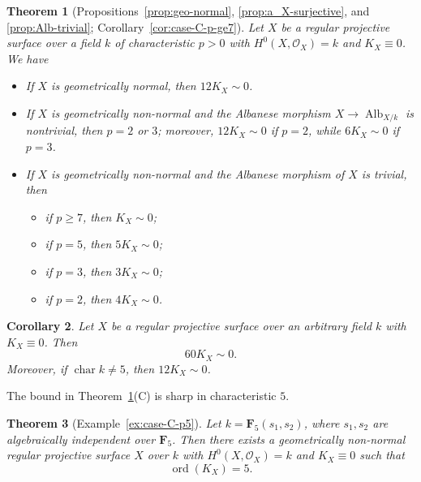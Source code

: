 \documentclass[10pt,abstract=true]{scrartcl}
\numberwithin{equation}{section}
\newtheorem{theorem}{Theorem}[section]
\newtheorem{corollary}[theorem]{Corollary}
\theoremstyle{definition}
\theoremstyle{remark}
\DeclareMathOperator\Alb{Alb}
\DeclareMathOperator\ord{ord}
\begin{document}
\begin{theorem}[{Propositions~\ref{prop:geo-normal}, \ref{prop:a_X-surjective}, and \ref{prop:Alb-trivial}; Corollary~\ref{cor:case-C-p-ge7}}]\label{thm:main}%
  Let $X$ be a regular projective surface over a field $k$ of characteristic $p>0$ with $H^0(X,\mathcal O_X) = k$ and $K_X \equiv 0$. 
  We have
  \begin{itemize}
    \item[\textup{(A)}]  If $X$ is geometrically normal, then $12 K_X \sim 0$.
    \item[\textup{(B)}]  If $X$ is geometrically non-normal and the Albanese morphism $X\to \Alb_{X/k}$ is nontrivial, then $p=2$ or $3$; moreover, $12K_X \sim 0$ if $p=2$, while $6K_X \sim 0$ if $p=3$.
    \item[\textup{(C)}]  If $X$ is geometrically non-normal and the Albanese morphism of $X$ is trivial, then 
      \begin{itemize}
        \item if $p \ge 7$, then $K_X \sim 0$;
        \item if $p = 5$, then $5 K_X \sim 0$;
        \item if $p = 3$, then $3 K_X \sim 0$;
        \item if $p = 2$, then $4 K_X \sim 0$.
      \end{itemize}
  \end{itemize}
\end{theorem}

\begin{corollary}\label{cor:uniform-bound}
  Let $X$ be a regular projective surface over an arbitrary field $k$ with $K_X\equiv0$.  Then
  \[
    60 K_X\sim0.
  \]
  Moreover, if $\operatorname{char} k\ne5$, then $12 K_X \sim 0$.
\end{corollary}

The bound in Theorem~\ref{thm:main}\textup{(C)} is sharp in characteristic $5$.
\begin{theorem}[{Example~\ref{ex:case-C-p5}}]\label{prop:order-five-intro}
  Let $k = \mathbf F_5(s_1,s_2)$, where $s_1,s_2$ are algebraically independent over $\mathbf F_5$.
  Then there exists a geometrically non-normal regular projective surface $X$ over $k$ with $H^0(X,\mathcal O_X) = k$ and $K_X\equiv0$ such that
  \[
    \ord(K_X) = 5.
  \]
\end{theorem}
\end{document}
